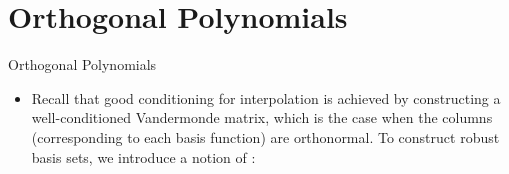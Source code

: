 %
%
%
%
%
%
\section{Orthogonal Polynomials}

\begin{frame}{Orthogonal Polynomials}


\begin{itemize}
\item Recall that good conditioning for interpolation is achieved by constructing a well-conditioned Vandermonde matrix, which is the case when the columns (corresponding to each basis
function) are orthonormal. To construct robust basis sets, we introduce a notion of :

\lgcond{
}

\end{itemize}

\end{frame}

